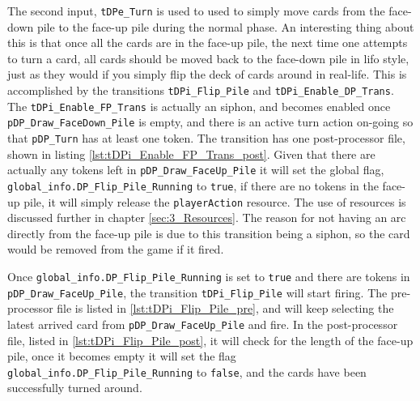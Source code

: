 \documentclass[runningheads,a4paper]{llncs}
\newcommand{\GPenSIM}{../GPenSIM}
\begin{document}
The second input, \verb!tDPe_Turn! is used to used to simply move cards from the face-down pile to the face-up pile during the normal phase. An interesting thing about this is that once all the cards are in the face-up pile, the next time one attempts to turn a \ac{card}, all cards should be moved back to the face-down pile in \ac{lifo} style, just as they would if you simply flip the deck of cards around in real-life. 
\newline
This is accomplished by the transitions \verb!tDPi_Flip_Pile! and \verb!tDPi_Enable_DP_Trans!. The \verb!tDPi_Enable_FP_Trans! is actually an siphon, and becomes enabled once \verb!pDP_Draw_FaceDown_Pile! is empty, and there is an active turn action on-going so that \verb!pDP_Turn! has at least one token. The transition has one post-processor file, shown in listing \ref{lst:tDPi_Enable_FP_Trans_post}. Given that there are actually any tokens left in \verb!pDP_Draw_FaceUp_Pile! it will set the global flag, \verb!global_info.DP_Flip_Pile_Running! to \verb!true!, if there are no tokens in the face-up pile, it will simply release the \verb!playerAction! resource. The use of resources is discussed further in chapter \ref{sec:3_Resources}. The reason for not having an arc directly from the face-up pile is due to this transition being a siphon, so the \ac{card} would be removed from the game if it fired.

Once \verb!global_info.DP_Flip_Pile_Running! is set to \verb!true! and there are tokens in \verb!pDP_Draw_FaceUp_Pile!, the transition \verb!tDPi_Flip_Pile! will start firing. The pre-processor file is listed in \ref{lst:tDPi_Flip_Pile_pre}, and will keep selecting the latest arrived \ac{card} from \verb!pDP_Draw_FaceUp_Pile! and fire. In the post-processor file, listed in \ref{lst:tDPi_Flip_Pile_post}, it will check for the length of the face-up pile, once it becomes empty it will set the flag \verb!global_info.DP_Flip_Pile_Running! to \verb!false!, and the cards have been successfully turned around.


\end{document}
